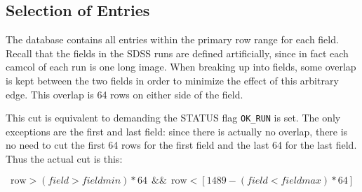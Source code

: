 \subsection{Selection of Entries}

The database contains all entries within the primary row range for each
field. Recall that the fields in the SDSS runs are defined artificially, since
in fact each camcol of each run is one long image. When breaking up into
fields, some overlap is kept between the two fields in order to minimize the
effect of this arbitrary edge.  This overlap is 64 rows on either side of the
field.

This cut is equivalent to demanding the STATUS flag \texttt{OK\_RUN} is
set. The only exceptions are the first and last field: since there is actually
no overlap, there is no need to cut the first 64 rows for the first field and
the last 64 for the last field.  Thus the actual cut is this:

\begin{equation}
\textrm{row} > (field > fieldmin)*64~~\&\&~~\textrm{row} < \left[1489 - (field < fieldmax)*64 \right]
\end{equation}
